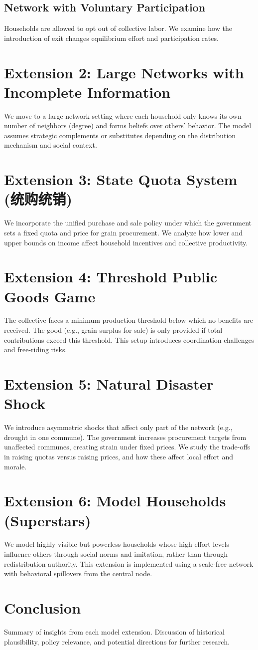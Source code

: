 \documentclass[12pt]{article}
\begin{document}
\subsection{Network with Voluntary Participation}
Households are allowed to opt out of collective labor. We examine how the introduction of exit changes equilibrium effort and participation rates.

\section{Extension 2: Large Networks with Incomplete Information}
We move to a large network setting where each household only knows its own number of neighbors (degree) and forms beliefs over others' behavior. The model assumes strategic complements or substitutes depending on the distribution mechanism and social context.

\section{Extension 3: State Quota System (统购统销)}
We incorporate the unified purchase and sale policy under which the government sets a fixed quota and price for grain procurement. We analyze how lower and upper bounds on income affect household incentives and collective productivity.

\section{Extension 4: Threshold Public Goods Game}
The collective faces a minimum production threshold below which no benefits are received. The good (e.g., grain surplus for sale) is only provided if total contributions exceed this threshold. This setup introduces coordination challenges and free-riding risks.

\section{Extension 5: Natural Disaster Shock}
We introduce asymmetric shocks that affect only part of the network (e.g., drought in one commune). The government increases procurement targets from unaffected communes, creating strain under fixed prices. We study the trade-offs in raising quotas versus raising prices, and how these affect local effort and morale.

\section{Extension 6: Model Households (Superstars)}
We model highly visible but powerless households whose high effort levels influence others through social norms and imitation, rather than through redistribution authority. This extension is implemented using a scale-free network with behavioral spillovers from the central node.

\section{Conclusion}
Summary of insights from each model extension. Discussion of historical plausibility, policy relevance, and potential directions for further research.
\end{document}
